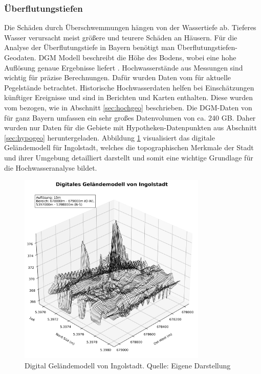 \subsubsection{Überflutungstiefen}
Die Schäden durch Überschwemmungen hängen von der Wassertiefe ab. Tieferes Wasser verursacht meist größere und teurere Schäden an Häusern. Für die Analyse der Überflutungstiefe in Bayern benötigt man Überflutungstiefen-Geodaten. \ac{DGM} Modell beschreibt die Höhe des Bodens, wobei eine hohe Auflösung genaue Ergebnisse liefert \parencite{vermessungsverwaltung2019gelandemodell}. Hochwasserstände aus Messungen sind wichtig für präzise Berechnungen. Dafür wurden Daten vom \textcite{bayern2016hochwassernachrichtendienst} für aktuelle Pegelstände betrachtet. Historische Hochwasserdaten helfen bei Einschätzungen künftiger Ereignisse und sind in Berichten und Karten enthalten. Diese wurden vom \textcite{LfU_Bayern} bezogen, wie in Abschnitt \ref{sec:hochgeo} beschrieben.
Die \ac{DGM}-Daten von \textcite{vermessungsverwaltung2019gelandemodell} für ganz Bayern umfassen ein sehr großes Datenvolumen von ca. 240 GB. Daher wurden nur Daten für die Gebiete mit Hypotheken-Datenpunkten aus Abschnitt \ref{sec:hypogeo} heruntergeladen. Abbildung \ref{fig:ingolstadt} visualisiert das digitale Geländemodell für Ingolstadt, welches die topographischen Merkmale der Stadt und ihrer Umgebung detailliert darstellt und somit eine wichtige Grundlage für die Hochwasseranalyse bildet.
\begin{figure}[!ht]
    \centering
    \includegraphics[width=0.8\textwidth]{figures/dgm_3d_wireframe_ingolstadt.png}
    \caption{Digital Geländemodell von Ingolstadt. Quelle: Eigene Darstellung}
    \label{fig:ingolstadt}
\end{figure}
\FloatBarrier